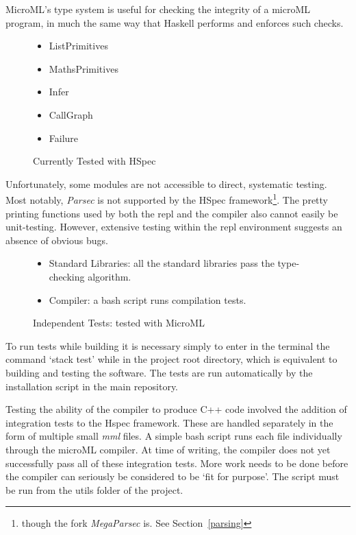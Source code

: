 \documentclass[12pt, a4paper]{report}
\begin{document}
MicroML's type system is useful for checking the integrity of a microML program, in much the same
way that Haskell performs and enforces such checks. 

\begin{figure}
    \begin{itemize}
        \item ListPrimitives
        \item MathsPrimitives
        \item Infer
        \item CallGraph
        \item Failure
    \end{itemize}
    \caption{Currently Tested with HSpec}
\label{fig:hspec}
\end{figure}

Unfortunately, some modules are not accessible to direct, systematic testing. Most notably,
\textit{Parsec} is not supported by the HSpec framework\footnote{though the fork
\textit{MegaParsec} is. See Section~\ref{parsing}}. The pretty printing functions used by both the
repl and the compiler also cannot easily be unit-testing. However, extensive testing within the repl
environment suggests an absence of obvious bugs.

\begin{figure}[H]
    \begin{itemize}
        \item Standard Libraries: all the standard libraries pass the type-checking algorithm.
        \item Compiler: a bash script runs compilation tests.
    \end{itemize}
    \caption{Independent Tests: tested with MicroML}
\label{fig:indtests}
\end{figure}

To run tests while building it is necessary simply to enter in the terminal the command `stack test'
while in the project root directory, which is equivalent to building and testing the
software. The tests are run automatically by the installation script in the main repository.

Testing the ability of the compiler to produce C++ code involved the addition of integration tests
to the Hspec framework. These are handled separately in the form of multiple small \textit{mml}
files. A simple bash script runs each file individually through the microML compiler. At time of
writing, the compiler does not yet successfully pass all of these integration tests. More work needs
to be done before the compiler can seriously be considered to be `fit for purpose'. The script must
be run from the utils folder of the project.
\end{document}
